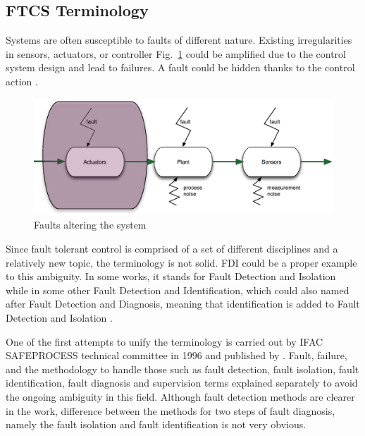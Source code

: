 \subsection{FTCS Terminology}\label{ch2:terminology}

Systems are often susceptible to faults of different nature. 
Existing irregularities in sensors, actuators, or controller Fig.~\ref{fig:faultsInTheSystem} could be amplified due to the control system design 
and lead to failures. 
A fault could be hidden thanks to the control action \cite{ducard2009fault}.

\begin{figure}
\begin{center}
\includegraphics[width=15cm]{figures/faultsInTheSystem}    %
\caption{Faults altering the system } 
\label{fig:faultsInTheSystem}
\end{center}
\end{figure}

Since fault tolerant control is comprised of a set of different disciplines and a relatively new topic, the terminology is not solid. 
FDI could be a proper example to this ambiguity. 
In some works, it stands for Fault Detection and Isolation while in some other Fault Detection and Identification, which could also named after Fault Detection and Diagnosis, 
meaning that identification is added to Fault Detection and Isolation \cite{zhang2008bibliographical}.

One of the first attempts to unify the terminology is carried out by IFAC SAFEPROCESS technical committee in 1996 and published by \cite{isermann1997trends}. 
Fault, failure, and the methodology to handle those such as fault detection, fault isolation, fault identification, fault diagnosis and supervision terms explained separately to avoid the ongoing ambiguity 
in this field. 
Although fault detection methods are clearer in the work, difference between the methods for two steps of fault diagnosis, namely the fault isolation and fault identification is not very obvious.

